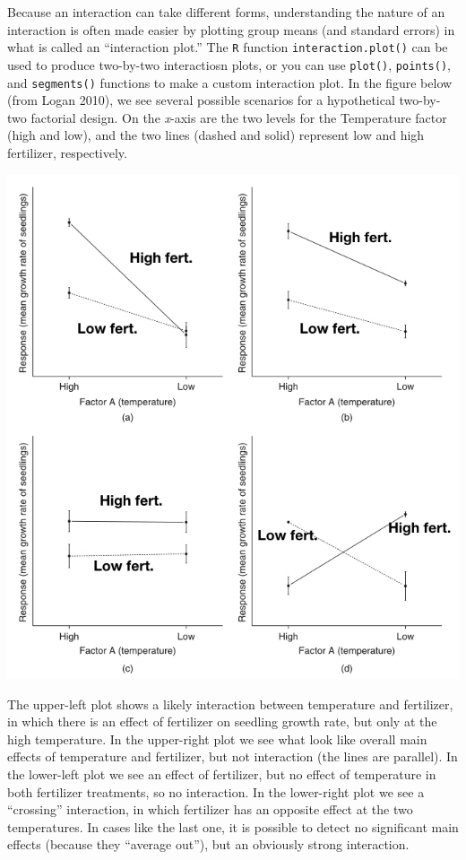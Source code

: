 \documentclass[]{book}
\begin{document}
Because an interaction can take different forms, understanding the nature of an interaction is often made easier by plotting group means (and standard errors) in what is called an ``interaction plot.'' The \texttt{R} function \texttt{interaction.plot()} can be used to produce two-by-two interactiosn plots, or you can use \texttt{plot()}, \texttt{points()}, and \texttt{segments()} functions to make a custom interaction plot. In the figure below (from Logan 2010), we see several possible scenarios for a hypothetical two-by-two factorial design. On the \emph{x}-axis are the two levels for the Temperature factor (high and low), and the two lines (dashed and solid) represent low and high fertilizer, respectively.

\begin{center}\includegraphics[width=0.75\linewidth]{images/images_7a.022} \end{center}

The upper-left plot shows a likely interaction between temperature and fertilizer, in which there is an effect of fertilizer on seedling growth rate, but only at the high temperature. In the upper-right plot we see what look like overall main effects of temperature and fertilizer, but not interaction (the lines are parallel). In the lower-left plot we see an effect of fertilizer, but no effect of temperature in both fertilizer treatments, so no interaction. In the lower-right plot we see a ``crossing'' interaction, in which fertilizer has an opposite effect at the two temperatures. In cases like the last one, it is possible to detect no significant main effects (because they ``average out''), but an obviously strong interaction.
\end{document}
